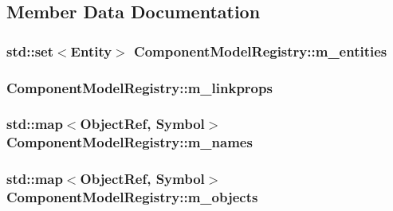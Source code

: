 \subsection{Member Data Documentation}
\hypertarget{class_component_model_registry_a2987c2cf0fccf7c4c32beee980548f50}{
\subsubsection[{m\+\_\+entities}]{\setlength{\rightskip}{0pt plus 5cm}std\+::set$<${\bf Entity}$>$ Component\+Model\+Registry\+::m\+\_\+entities\hspace{0.3cm}{\ttfamily [protected]}}}\label{class_component_model_registry_a2987c2cf0fccf7c4c32beee980548f50}
\hypertarget{class_component_model_registry_a80e6aac08b0471a248b1c9eb1a903f96}{
\subsubsection[{m\+\_\+linkprops}]{ Component\+Model\+Registry\+::m\+\_\+linkprops\hspace{0.3cm}{\ttfamily [protected]}}}\label{class_component_model_registry_a80e6aac08b0471a248b1c9eb1a903f96}
\hypertarget{class_component_model_registry_a41c18375b49c196440c14124ef24ec7e}{
\subsubsection[{m\+\_\+names}]{\setlength{\rightskip}{0pt plus 5cm}std\+::map$<${\bf Object\+Ref}, {\bf Symbol}$>$ Component\+Model\+Registry\+::m\+\_\+names\hspace{0.3cm}{\ttfamily [protected]}}}\label{class_component_model_registry_a41c18375b49c196440c14124ef24ec7e}
\hypertarget{class_component_model_registry_ae0e32b8bfee83babf0d403c6e3b64f36}{
\subsubsection[{m\+\_\+objects}]{\setlength{\rightskip}{0pt plus 5cm}std\+::map$<${\bf Object\+Ref}, {\bf Symbol}$>$ Component\+Model\+Registry\+::m\+\_\+objects\hspace{0.3cm}{\ttfamily [protected]}}}\label{class_component_model_registry_ae0e32b8bfee83babf0d403c6e3b64f36}

